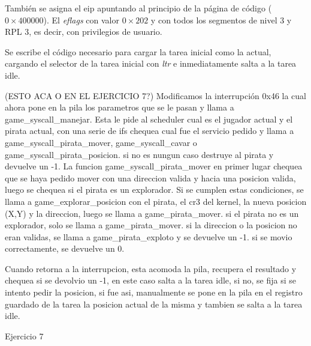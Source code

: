 También se asigna el eip apuntando al principio de la página de código
($0\times400000$). El {\it eflags\/} con valor $0\times202$ y con todos los
segmentos de nivel 3 y RPL 3, es decir, con privilegios de usuario.

Se escribe el código necesario para cargar la tarea inicial como la actual,
cargando el selector de la tarea inicial con {\it ltr\/} e inmediatamente salta
a la tarea idle.

(ESTO ACA O EN EL EJERCICIO 7?)
Modificamos la interrupción 0x46 la cual ahora pone en la pila los parametros que se le pasan
y llama a game_syscall_manejar. Esta le pide al scheduler cual es el jugador actual y el pirata actual,
con una serie de ifs chequea cual fue el servicio pedido y llama a game_syscall_pirata_mover, game_syscall_cavar o
game_syscall_pirata_posicion. si no es nungun caso destruye al pirata y devuelve un -1.
  La funcion game_syscall_pirata_mover en primer lugar chequea que se haya pedido mover con una
  direccion valida y hacia una posicion valida, luego se chequea si el pirata es un explorador.
  Si se cumplen estas condiciones, se llama a game_explorar_posicion con el pirata, el cr3 del kernel, la nueva
  posicion (X,Y) y la direccion, luego se llama a game_pirata_mover. si el pirata no es un explorador,
  solo se llama a game_pirata_mover. si la direccion o la posicion no eran validas, se llama a game_pirata_exploto
  y se devuelve un -1. si se movio correctamente, se devuelve un 0.

Cuando retorna a la interrupcion, esta acomoda la pila, recupera el resultado y chequea si se devolvio un -1,
en este caso salta a la tarea idle, si no, se fija si se intento pedir la posicion, si fue asi, manualmente se
pone en la pila en el registro guardado de la tarea la posicion actual de la misma y tambien se salta a la tarea idle.


Ejercicio 7

